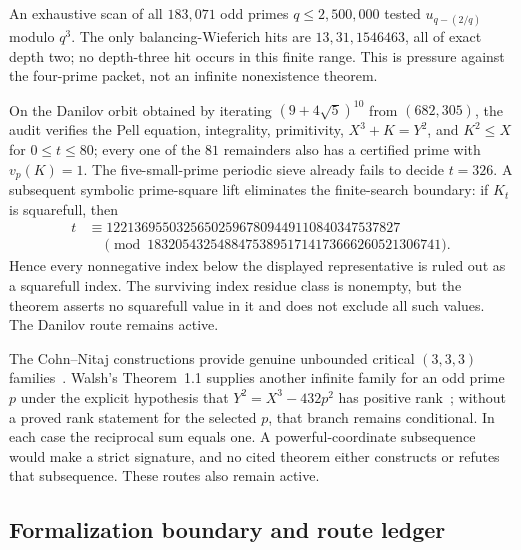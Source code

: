 An exhaustive scan of all $183{,}071$ odd primes $q\leq2{,}500{,}000$ tested
$u_{q-(2/q)}$ modulo $q^3$.  The only balancing-Wieferich hits are
$13,31,1546463$, all of exact depth two; no depth-three hit occurs in this
finite range.  This is pressure against the four-prime packet, not an
infinite nonexistence theorem.

On the Danilov orbit obtained by iterating
$(9+4\sqrt5)^{10}$ from $(682,305)$, the audit verifies the Pell equation,
integrality, primitivity, $X^3+K=Y^2$, and $K^2\leq X$ for
$0\leq t\leq80$; every one of the $81$ remainders also has a certified prime
with $v_p(K)=1$.  The five-small-prime periodic sieve already fails to decide
$t=326$.  A subsequent symbolic prime-square lift eliminates the finite-search
boundary: if $K_t$ is squarefull, then
\begin{equation}\label{eq:bp-Danilov-global-sieve}
 \begin{aligned}
 t&\equiv122136955032565025967809449110840347537827\\
  &\hspace{1em}\pmod{183205432548847538951714173666260521306741}.
 \end{aligned}
\end{equation}
Hence every nonnegative index below the displayed representative is ruled out
as a squarefull index.  The surviving index residue class is nonempty, but the
theorem asserts no squarefull value in it and does not exclude all such values.
The Danilov route remains active.

The Cohn--Nitaj constructions provide genuine unbounded critical $(3,3,3)$
families~\cite{Nitaj1995,Cohn1998}.  Walsh's Theorem~1.1 supplies another
infinite family for an odd prime $p$ under the explicit hypothesis that
\(Y^2=X^3-432p^2\) has positive rank~\cite{Walsh2024}; without a proved rank
statement for the selected $p$, that branch remains conditional.  In each
case the reciprocal sum equals one.  A powerful-coordinate subsequence would
make a strict signature, and no cited theorem either constructs or refutes
that subsequence.  These routes also remain active.

\subsection{Formalization boundary and route ledger}

